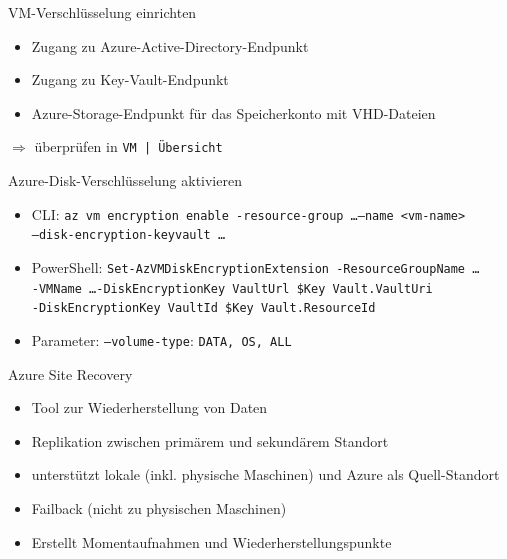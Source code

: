 \begin{flashcard}[Definition]{VM-Verschlüsselung einrichten}
    \begin{itemize}
        \item Zugang zu Azure-Active-Directory-Endpunkt
        \item Zugang zu Key-Vault-Endpunkt
        \item Azure-Storage-Endpunkt für das Speicherkonto mit VHD-Dateien
    \end{itemize}
    \vspace{1cm}
    $\Rightarrow$ überprüfen in \texttt{VM | Übersicht}
\end{flashcard}

\begin{flashcard}[Definition]{Azure-Disk-Verschlüsselung aktivieren}
    \begin{itemize}
        \item CLI:\newline
            \texttt{az vm encryption enable -resource-group \ldots --name <vm-name>\\--disk-encryption-keyvault \ldots}
        \item PowerShell:\newline
            \texttt{Set-AzVMDiskEncryptionExtension -ResourceGroupName \ldots\\-VMName \ldots -DiskEncryptionKey VaultUrl \$Key Vault.VaultUri\\-DiskEncryptionKey VaultId \$Key Vault.ResourceId}
        \item Parameter: \texttt{--volume-type}: \texttt{DATA, OS, ALL}
    \end{itemize}
\end{flashcard}


\begin{flashcard}[Definition]{Azure Site Recovery}
    \begin{itemize}
        \item Tool zur Wiederherstellung von Daten
        \item Replikation zwischen primärem und sekundärem Standort
        \item unterstützt lokale (inkl. physische Maschinen) und Azure als Quell-Standort
        \item Failback (nicht zu physischen Maschinen)
        \item Erstellt Momentaufnahmen und Wiederherstellungspunkte
    \end{itemize}
\end{flashcard}

